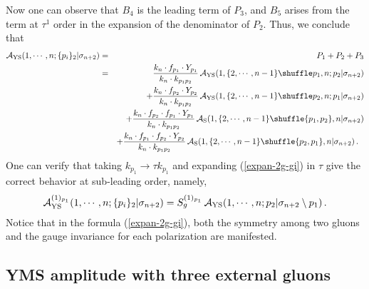 \documentclass[preprint,showpacs,onecolumn,nofootinbib]{revtex4}
\newcommand{\bea}{\begin{eqnarray}}
\newcommand{\eea}{\end{eqnarray}}
\newcommand{\nn}{\nonumber \\}
\def\eref#1{(\ref{#1})}
\begin{document}
Now one can observe that $B_4$ is the leading term of $P_3$, and $B_5$ arises from the term at $\tau^1$ order in the expansion of the denominator of $P_2$. Thus, we conclude that
%
\bea
{\cal A}_{\rm YS}(1,\cdots,n;\{p_i\}_2|\sigma_{n+2})&=&P_1+P_2+P_3\nn
&=&{k_n\cdot f_{p_1}\cdot Y_{p_1}\over k_n\cdot k_{p_1p_2}}\,{\cal A}_{\rm YS}(1,\{2,\cdots,n-1\}\shuffle p_1,n;p_2|\sigma_{n+2})\nn
& &+{k_n\cdot f_{p_2}\cdot Y_{p_2}\over k_n\cdot k_{p_1p_2}}\,{\cal A}_{\rm YS}(1,\{2,\cdots,n-1\}\shuffle p_2,n;p_1|\sigma_{n+2})\nn
& &+{k_n\cdot f_{p_2}\cdot f_{p_1}\cdot Y_{p_1}\over k_n\cdot k_{p_1p_2}}\,{\cal A}_{\rm S}(1,\{2,\cdots,n-1\}\shuffle \{p_1,p_2\},n|\sigma_{n+2})\nn
& &+{k_n\cdot f_{p_1}\cdot f_{p_2}\cdot Y_{p_2}\over k_n\cdot k_{p_1p_2}}\,{\cal A}_{\rm S}(1,\{2,\cdots,n-1\}\shuffle \{p_2,p_1\},n|\sigma_{n+2})\,.~~\label{expan-2g-gi}
\eea
%
One can verify that taking $k_{p_1}\to\tau k_{p_1}$ and expanding \eref{expan-2g-gi} in $\tau$ give the correct behavior at sub-leading order, namely,
%
\bea
{\cal A}^{(1)_{p_1}}_{\rm YS}(1,\cdots,n;\{p_i\}_2|\sigma_{n+2})=S^{(1)_{p_1}}_g\,{\cal A}_{\rm YS}(1,\cdots,n;p_2|\sigma_{n+2}\setminus p_1)\,.
\eea
%
Notice that in the formula \eref{expan-2g-gi}, both the symmetry among two gluons and the gauge invariance for each polarization are manifested.

\subsection{YMS amplitude with three external gluons}
\label{subsec-3gluon}
\end{document}
